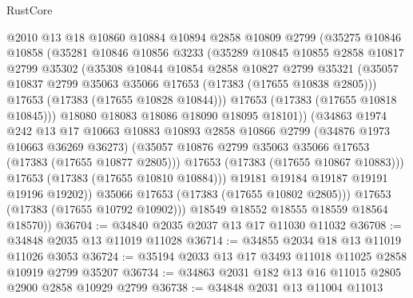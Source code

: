 \begin{lexlean}{RustCore}
\begin{coremodule}
                  @2010
                  @13
                  @18
                  @10860
                  @10884
                  @10894
                  @2858
                  @10809
                  @2799
                  (@35275
                    @10846
                    @10858
                    (@35281
                      @10846
                      @10856
                      @3233
                      (@35289
                        @10845
                        @10855
                        @2858
                        @10817
                        @2799
                        @35302
                        (@35308
                          @10844
                          @10854
                          @2858
                          @10827
                          @2799
                          @35321
                          (@35057 @10837 @2799 @35063 @35066 @17653 (@17383 (@17655 @10838 @2805)))
                          @17653
                          (@17383 (@17655 @10828 @10844)))
                        @17653
                        (@17383 (@17655 @10818 @10845)))
                      @18080
                      @18083
                      @18086
                      @18090
                      @18095
                      @18101))
                  (@34863
                    @1974
                    @242
                    @13
                    @17
                    @10663
                    @10883
                    @10893
                    @2858
                    @10866
                    @2799
                    (@34876 @1973 @10663 @36269 @36273)
                    (@35057 @10876 @2799 @35063 @35066 @17653 (@17383 (@17655 @10877 @2805)))
                    @17653
                    (@17383 (@17655 @10867 @10883)))
                  @17653
                  (@17383 (@17655 @10810 @10884)))
                @19181
                @19184
                @19187
                @19191
                @19196
                @19202))
            @35066
            @17653
            (@17383 (@17655 @10802 @2805)))
          @17653
          (@17383 (@17655 @10792 @10902)))
        @18549
        @18552
        @18555
        @18559
        @18564
        @18570))
@36704 := @34840 @2035 @2037 @13 @17 @11030 @11032
@36708 := @34848 @2035 @13 @11019 @11028
@36714 := @34855 @2034 @18 @13 @11019 @11026 @3053
@36724 := @35194 @2033 @13 @17 @3493 @11018 @11025 @2858 @10919 @2799 @35207
@36734 := @34863 @2031 @182 @13 @16 @11015 @2805 @2900 @2858 @10929 @2799
@36738 := @34848 @2031 @13 @11004 @11013

\end{coremodule}
\end{lexlean}

